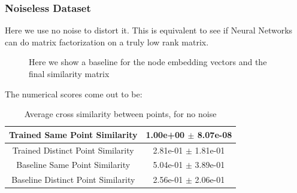 \documentclass[a4paper]{article}
\begin{document}
\subsubsection*{Noiseless Dataset}
Here we use no noise to distort it. This is equivalent to see if Neural Networks can do matrix factorization on a truly low rank matrix.
\begin{figure}[H]
    \centering
    \caption{Here we show a baseline for the node embedding vectors and the final similarity matrix}
    \label{fig:noiseless_plot}
\end{figure}
The numerical scores come out to be:
\begin{table}[H]
    \centering
    \begin{tabular}{|c|c|} \hline
        Trained Same Point Similarity      & 1.00e+00 $\pm$ 8.07e-08  \\ \hline
        Trained Distinct Point Similarity  & 2.81e-01 $\pm$ 1.81e-01  \\ \hline
        Baseline Same Point Similarity     & 5.04e-01 $\pm$ 3.89e-01  \\ \hline
        Baseline Distinct Point Similarity & 2.56e-01 $\pm$ 2.06e-01  \\ \hline
    \end{tabular}
    \caption{Average cross similarity between points, for no noise}
    \label{tab:noiseless_table}
\end{table}
\end{document}
